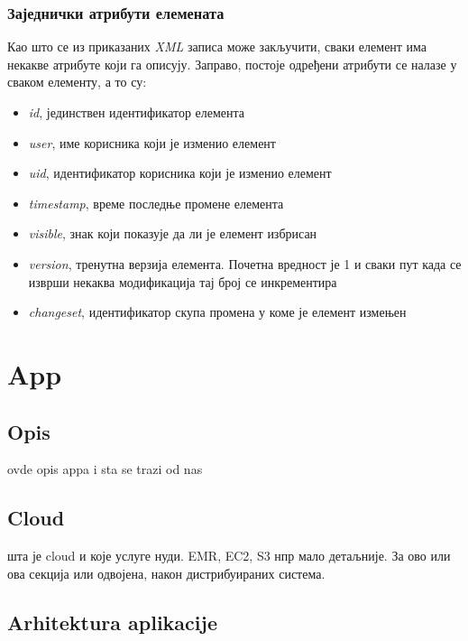 \documentclass[12pt,oneside]{memoir}
\begin{document}
\subsection{Заједнички атрибути елемената}
\label{subsec:osm_atributi}

Као што се из приказаних \textit{XML} записа може закључити, сваки елемент има некакве атрибуте који га описују. Заправо, постоје одређени атрибути се налазе у сваком елементу, а то су:

\begin{itemize}
\item \textit{id}, јединствен идентификатор елемента
\item \textit{user}, име корисника који је изменио елемент
\item \textit{uid}, идентификатор корисника који је изменио елемент
\item \textit{timestamp}, време последње промене елемента
\item \textit{visible}, знак који показује да ли је елемент избрисан
\item \textit{version}, тренутна верзија елемента. Почетна вредност је 1 и сваки пут када се изврши некаква модификација тај број се инкрементира
\item \textit{changeset}, идентификатор скупа промена у коме је елемент измењен
\end{itemize}

\chapter{App}
\label{chp:app}

\section{Opis}
\label{sec:opis}

ovde opis appa i sta se trazi od nas

\section{Cloud}
\label{sec:cloud}

шта је cloud и које услуге нуди. EMR, EC2, S3 нпр мало детаљније. За ово или ова секција или одвојена, након дистрибуираних система.

\section{Arhitektura aplikacije}
\label{sec:app_aphi}
\end{document}
